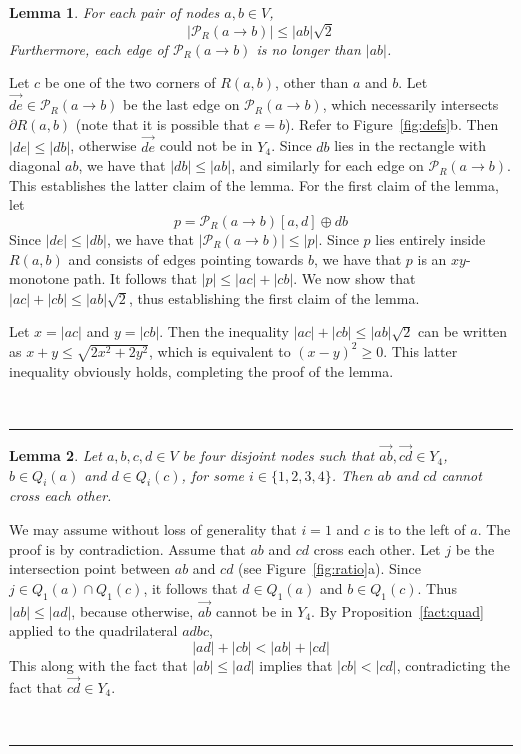 \pdfoutput=1  \documentclass[11pt]{article}
\newtheorem{lemma}{Lemma}
\newcommand{\qed}{\rule{0.5em}{1.5ex}}
\newcommand{\fqed}{{\hfill~\qed}}
\newenvironment{proof}{{\noindent \bf Proof.}}
                      {{\hfill \fqed} \vspace{1em}}
\newcommand{\Pa}{{\mathcal P}}
\begin{document}
\begin{lemma}
For each pair of nodes $a, b \in V$,
\begin{equation}
|\Pa_R(a \rightarrow b)| \le |ab| \sqrt{2}
\label{eq:PR}
\end{equation}
Furthermore, each edge of $\Pa_R(a \rightarrow b)$ is no longer than $|ab|$.
\label{lem:PR}
\end{lemma}
\begin{proof}
Let $c$ be one of the two corners of $R(a, b)$, other than $a$ and $b$.
Let $\overrightarrow{de} \in \Pa_R(a \rightarrow b)$ be the last edge
on $\Pa_R(a \rightarrow b)$, which necessarily intersects
$\partial R(a,b)$ (note that it is possible that $e = b$). Refer to
Figure~\ref{fig:defs}b.
Then $|de| \le |db|$, otherwise $\overrightarrow{de}$ could not be in $Y_4$.
Since $db$ lies in the rectangle with diagonal $ab$, we have that
$|db| \le |ab|$,
and similarly for each edge on $\Pa_R(a \rightarrow b)$.
This establishes the latter claim of the lemma. For the first claim of
the lemma, let
\[
    p = \Pa_R(a \rightarrow b)[a,d] \oplus db
\]
Since $|de| \le |db|$, we have that $|\Pa_R(a \rightarrow b)| \le |p|$.
Since $p$ lies entirely inside $R(a,b)$ and consists of edges pointing
towards $b$, we have that $p$ is an $xy$-monotone path. It follows that
$|p| \le |ac| + |cb|$. We now show that
$|ac|+|cb| \le |ab|\sqrt{2}$, thus establishing the first
claim of the lemma.

Let $x=|ac|$ and $y=|cb|$. Then the inequality
$|ac|+|cb| \le |ab|\sqrt{2}$ can be written as
$x+y \leq \sqrt{2 x^2 + 2y^2}$, which is equivalent to
$(x-y)^2 \geq 0$. This latter inequality obviously holds,
completing the proof of the lemma.
\end{proof}

\begin{lemma}
Let $a, b, c, d \in V$ be four disjoint nodes such that
$\overrightarrow{ab}, \overrightarrow{cd} \in Y_4$, $b \in Q_i(a)$
and $d \in Q_i(c)$, for some $i \in \{1,2,3,4\}$. Then $ab$ and $cd$
cannot cross each other.
\label{lem:same.quadrant}
\end{lemma}
\begin{proof}
We may assume without loss of generality that $i=1$ and $c$ is to the
left of $a$. The proof is by contradiction. Assume that $ab$ and $cd$ cross each
other. Let $j$ be the intersection point between $ab$ and $cd$ (see Figure~\ref{fig:ratio}a).
Since $j \in Q_1(a) \cap Q_1(c)$,
it follows that $d \in Q_1(a)$ and $b \in Q_1(c)$. Thus $|ab| \le |ad|$, because
otherwise, $\overrightarrow{ab}$ cannot be in $Y_4$.
By
Proposition~\ref{fact:quad}
applied to the quadrilateral $adbc$,
\[
    |ad| + |cb| < |ab| +|cd|
\]
This along with the fact that $|ab| \le |ad|$ implies that
$|cb| < |cd|$, contradicting the fact that $\overrightarrow{cd} \in Y_4$.
\end{proof}
\end{document}
